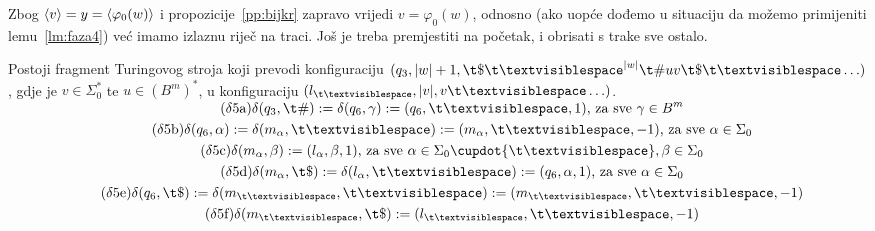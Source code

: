 Zbog $\langle v\rangle=y=\langle\varphi_0(w)\rangle$ i propozicije~\ref{pp:bijkr} zapravo vrijedi $v=\varphi_0(w)$, odnosno (ako uopće dođemo u situaciju da možemo primijeniti lemu~\ref{lm:faza4}) već imamo izlaznu riječ na traci. Još je treba premjestiti na početak, i obrisati s trake sve ostalo.


\begin{lema}[{name=[peti fragment transpiliranog stroja]}]\label{lm:faza5}
Postoji fragment Turingovog stroja koji prevodi konfiguraciju $(q_3,\dulj w+1,\t\$\bl^{\dulj w}\t\#uv\t\$\bl\ldots)$, gdje je $v\in\Sigma_0^*$ te $u\in(B^m)^*$, u konfiguraciju $(l_{\bl},\dulj v,v\bl\ldots)$.
\end{lema}
\noindent\begin{gather*}
    \SwapAboveDisplaySkip
\label{d:81}\tag{$\delta$5a}\delta(q_3,\t\#):=\delta(q_6,\gamma):=(q_6,\bl,1)\text{, za sve }\gamma\in B^m\\
\label{d:83}\tag{$\delta$5b}\delta(q_6,\alpha):=\delta(m_\alpha,\bl):=(m_\alpha,\bl,-1)\text{, za sve }\alpha\in\Sigma_0\\
    \label{d:85}\tag{$\delta$5c}\delta(m_\alpha,\beta):=(l_\alpha,\beta,1)\text{, za sve }\alpha\in\Sigma_0\dcup\{\bl\},\beta\in\Sigma_0\\
\label{d:86}\tag{$\delta$5d}\delta(m_\alpha,\t\$):=\delta(l_\alpha,\bl):=(q_6,\alpha,1)\text{, za sve }\alpha\in\Sigma_0\\
\label{d:87}\tag{$\delta$5e}\delta(q_6,\t\$):=\delta(m_{\bl},\bl):=(m_{\bl},\bl,-1)\\
\label{d:89}\tag{$\delta$5f}\delta(m_{\bl},\t\$):=(l_{\bl},\bl,-1)
\end{gather*}

